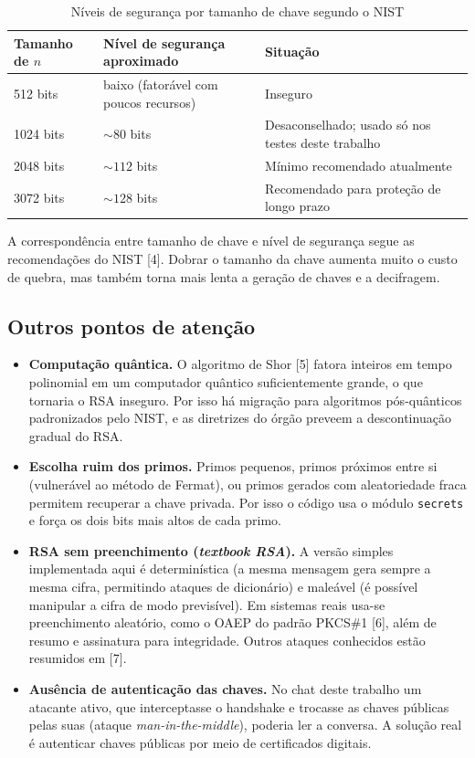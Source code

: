 \documentclass[11pt, a4paper]{article}
\begin{document}
\begin{table}[h!]
    \centering
    \caption{Níveis de segurança por tamanho de chave segundo o NIST}
    \begin{tabular}{lll}
        \toprule
        \textbf{Tamanho de $n$} & \textbf{Nível de segurança aproximado} & \textbf{Situação} \\
        \midrule
        512 bits & baixo (fatorável com poucos recursos) & Inseguro \\
        1024 bits & $\sim 80$ bits & Desaconselhado; usado só nos testes deste trabalho \\
        2048 bits & $\sim 112$ bits & Mínimo recomendado atualmente \\
        3072 bits & $\sim 128$ bits & Recomendado para proteção de longo prazo \\
        \bottomrule
    \end{tabular}
\end{table}

A correspondência entre tamanho de chave e nível de segurança segue as recomendações do NIST [4]. Dobrar o tamanho da chave aumenta muito o custo de quebra, mas também torna mais lenta a geração de chaves e a decifragem.

\subsection{Outros pontos de atenção}
\begin{itemize}[leftmargin=*]
    \item \textbf{Computação quântica.} O algoritmo de Shor [5] fatora inteiros em tempo polinomial em um computador quântico suficientemente grande, o que tornaria o RSA inseguro. Por isso há migração para algoritmos pós-quânticos padronizados pelo NIST, e as diretrizes do órgão preveem a descontinuação gradual do RSA.
    \item \textbf{Escolha ruim dos primos.} Primos pequenos, primos próximos entre si (vulnerável ao método de Fermat), ou primos gerados com aleatoriedade fraca permitem recuperar a chave privada. Por isso o código usa o módulo \texttt{secrets} e força os dois bits mais altos de cada primo.
    \item \textbf{RSA sem preenchimento (\textit{textbook RSA}).} A versão simples implementada aqui é determinística (a mesma mensagem gera sempre a mesma cifra, permitindo ataques de dicionário) e maleável (é possível manipular a cifra de modo previsível). Em sistemas reais usa-se preenchimento aleatório, como o OAEP do padrão PKCS\#1 [6], além de resumo e assinatura para integridade. Outros ataques conhecidos estão resumidos em [7].
    \item \textbf{Ausência de autenticação das chaves.} No chat deste trabalho um atacante ativo, que interceptasse o handshake e trocasse as chaves públicas pelas suas (ataque \textit{man-in-the-middle}), poderia ler a conversa. A solução real é autenticar chaves públicas por meio de certificados digitais.
\end{itemize}
\end{document}
